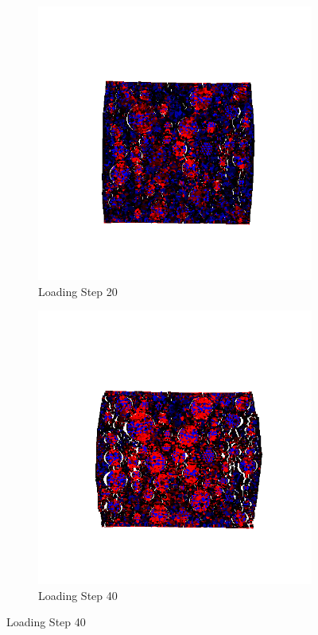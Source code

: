 \begin{figure}[ht]
\begin{subfigure}{.33\textwidth}
      \includegraphics[width=1.0\linewidth]{Files/A30P75_3_IS/DEP50-STEP(040).png}
      \caption{Loading Step 20}
      \end{subfigure}%
      \begin{subfigure}{.33\textwidth}
        \centering
        \includegraphics[width=1.0\linewidth]{Files/A30P75_3_IS/DEP50-STEP(060).png}
        \caption{Loading Step 40}
      \end{subfigure}


\end{figure}
